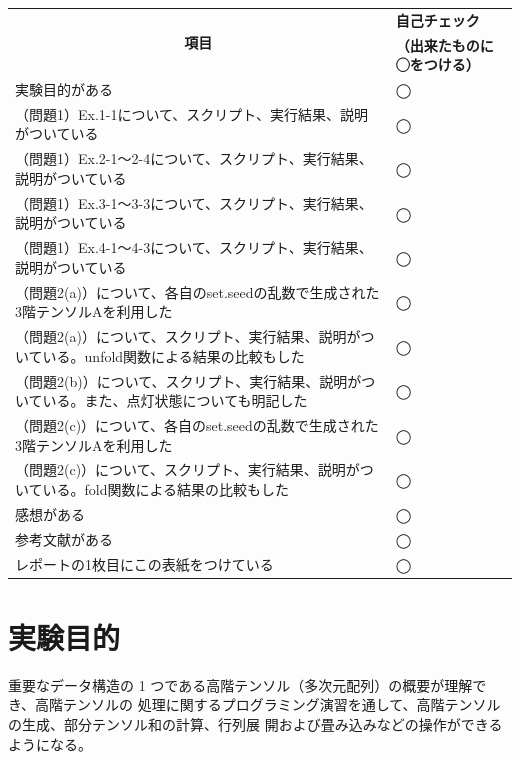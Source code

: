 \documentclass[12pt,a4paper]{ltjsarticle}
\begin{document}
\begin{titlepage}
\begin{center}
\begin{tabularx}{\textwidth}{|X|>{\centering\arraybackslash}m{5cm}|}
  \hline
  \multicolumn{1}{|c|}{\multirow{2}{*}{\textbf{項目}}} & \textbf{自己チェック} \\
  & \textbf{（出来たものに◯をつける）} \\
  \hline
  実験目的がある & ◯\\
  \hline
  （問題1）Ex.1-1について、スクリプト、実行結果、説明がついている & ◯\\
  \hline
  （問題1）Ex.2-1～2-4について、スクリプト、実行結果、説明がついている & ◯\\
  \hline
  （問題1）Ex.3-1～3-3について、スクリプト、実行結果、説明がついている & ◯\\
  \hline
  （問題1）Ex.4-1～4-3について、スクリプト、実行結果、説明がついている & ◯\\
  \hline
  （問題2(a)）について、各自のset.seedの乱数で生成された3階テンソルAを利用した & ◯\\
  \hline
  （問題2(a)）について、スクリプト、実行結果、説明がついている。unfold関数による結果の比較もした & ◯\\
  \hline
  （問題2(b)）について、スクリプト、実行結果、説明がついている。また、点灯状態についても明記した & ◯\\
  \hline
  （問題2(c)）について、各自のset.seedの乱数で生成された3階テンソルAを利用した & ◯\\
  \hline
  （問題2(c)）について、スクリプト、実行結果、説明がついている。fold関数による結果の比較もした & ◯\\
  \hline
  感想がある & ◯\\
  \hline
  参考文献がある & ◯\\
  \hline
  レポートの1枚目にこの表紙をつけている & ◯\\
  \hline
\end{tabularx}
\end{center}
  
\end{titlepage}

\newpage
\thispagestyle{frontmatter}
\tableofcontents

\newpage
{}
\setcounter{page}{1}


\section{実験目的}\label{sec:objective}
重要なデータ構造の 1 つである高階テンソル（多次元配列）の概要が理解でき、高階テンソルの
処理に関するプログラミング演習を通して、高階テンソルの生成、部分テンソル和の計算、行列展
開および畳み込みなどの操作ができるようになる。
\end{document}
